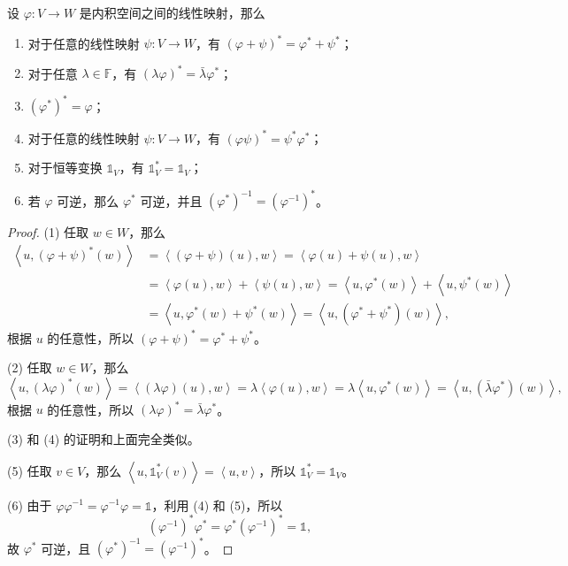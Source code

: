 \documentclass[fontset=none,zihao=-4]{Notes}
\newcommand{\inn}[1]{\left\langle#1\right\rangle}
\begin{document}
\begin{proposition}[伴随映射的性质]
  设 $\varphi:V\to W$ 是内积空间之间的线性映射，那么
  \begin{enumerate}
    \item 对于任意的线性映射 $\psi:V\to W$，有 $(\varphi+\psi)^*=\varphi^*+\psi^*$；
    \item 对于任意 $\lambda\in\mathbb{F}$，有 $(\lambda\varphi)^*=\bar\lambda\varphi^*$；
    \item $(\varphi^*)^*=\varphi$；
    \item 对于任意的线性映射 $\psi:V\to W$，有 $(\varphi\psi)^*=\psi^*\varphi^*$；
    \item 对于恒等变换 $\mathbb{1}_V$，有 $\mathbb{1}_V^*=\mathbb{1}_V$；
    \item 若 $\varphi$ 可逆，那么 $\varphi^*$ 可逆，并且 $(\varphi^*)^{-1}=(\varphi^{-1})^*$。
  \end{enumerate}
\end{proposition}
\begin{proof}
  (1) 任取 $w\in W$，那么
  \begin{align*}
    \inn{u,(\varphi+\psi)^*(w)}&=\inn{(\varphi+\psi)(u),w}=
    \inn{\varphi(u)+\psi(u),w}\\
    &=  \inn{\varphi(u),w}+\inn{\psi(u),w}=\inn{u,\varphi^*(w)}+
    \inn{u,\psi^*(w)}\\
    &=\inn{u,\varphi^*(w)+\psi^*(w)}=\inn{u,(\varphi^*+\psi^*)(w)},
  \end{align*}
  根据 $u$ 的任意性，所以 $(\varphi+\psi)^*=\varphi^*+\psi^*$。

  (2) 任取 $w\in W$，那么
  \[
    \inn{u,(\lambda\varphi)^*(w)}=\inn{(\lambda\varphi)(u),w}=\lambda\inn{\varphi(u),w}
    =\lambda\inn{u,\varphi^*(w)}=\inn{u,(\bar\lambda\varphi^*)(w)},
  \]
  根据 $u$ 的任意性，所以 $(\lambda\varphi)^*=\bar\lambda\varphi^*$。

  (3) 和 (4) 的证明和上面完全类似。

  (5) 任取 $v\in V$，那么 $\inn{u,\mathbb{1}_V^*(v)}=\inn{u,v}$，所以 $\mathbb{1}_V^*=\mathbb{1}_V$。

  (6) 由于 $\varphi\varphi^{-1}=\varphi^{-1}\varphi=\mathbb{1}$，利用 (4) 和 (5)，所以
  \[
    (\varphi^{-1})^*\varphi^*=\varphi^*(\varphi^{-1})^*=\mathbb{1},  
  \]
  故 $\varphi^*$ 可逆，且 $(\varphi^*)^{-1}=(\varphi^{-1})^*$。
\end{proof}
\end{document}
